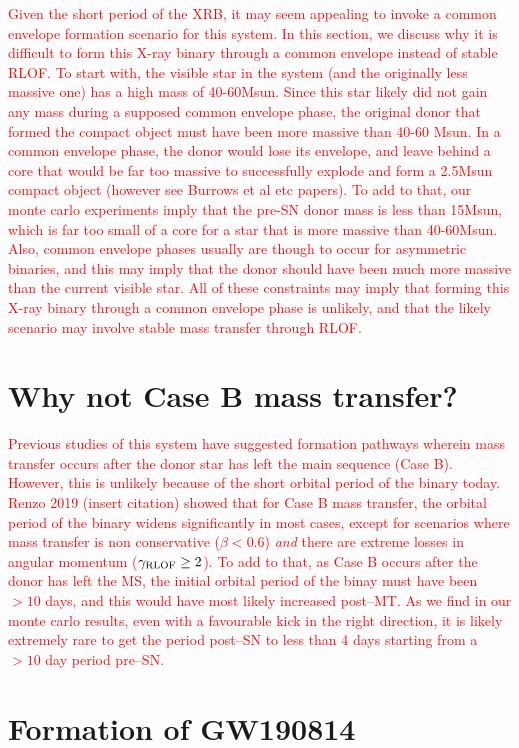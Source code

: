 \documentclass[linenumbers,trackchanges,twocolumn]{aastex701}
\newcommand{\red}{\textcolor{red}}
\begin{document}
\red{Given the short period of the XRB, it may seem appealing to invoke a common envelope formation scenario for this system. In this section, we discuss why it is difficult to form this X-ray binary through a common envelope instead of stable RLOF. To start with, the visible star in the system (and the originally less massive one) has a high mass of 40-60Msun. Since this star likely did not gain any mass during a supposed common envelope phase, the original donor that formed the compact object must have been more massive than 40-60 Msun. In a common envelope phase, the donor would lose its envelope, and leave behind a core that would be far too massive to successfully explode and form a 2.5Msun compact object (however see Burrows et al etc papers). To add to that, our monte carlo experiments imply that the pre-SN donor mass is less than 15Msun, which is far too small of a core for a star that is more massive than 40-60Msun. Also, common envelope phases usually are though to occur for asymmetric binaries, and this may imply that the donor should have been much more massive than the current visible star. All of these constraints may imply that forming this X-ray binary through a common envelope phase is unlikely, and that the likely scenario may involve stable mass transfer through RLOF.}

\section{Why not Case B mass transfer?}

\red{Previous studies of this system have suggested formation pathways wherein mass transfer occurs after the donor star has left the main sequence (Case B). However, this is unlikely because of the short orbital period of the binary today. Renzo 2019 (insert citation) showed that for Case B mass transfer, the orbital period of the binary widens significantly in most cases, except for scenarios where mass transfer is non conservative ($\beta < 0.6$) \textit{and} there are extreme losses in angular momentum ($\gamma_{\rm RLOF} \geq 2$). To add to that, as Case B occurs after the donor has left the MS, the initial orbital period of the binay must have been $>10$ days, and this would have most likely increased post--MT. As we find in our monte carlo results, even with a favourable kick in the right direction, it is likely extremely rare to get the period post--SN to less than 4 days starting from a $>10$ day period pre--SN.}

\section{Formation of GW190814} 
\end{document}
